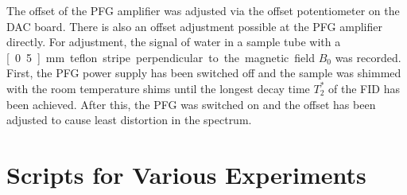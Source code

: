 \documentclass[12pt, a4paper, BCOR10mm, twoside, titlepage, headinclude]{scrbook}
\begin{document}
The offset of the PFG amplifier was adjusted via the offset potentiometer on the DAC board. There is also an offset adjustment possible at the PFG amplifier directly. For adjustment, the signal of water in a sample tube with a \unit[0.5]{mm} teflon stripe perpendicular to the magnetic field $B_{0}$ was recorded. First, the PFG power supply has been switched off and the sample was shimmed with the room temperature shims until the longest decay time $T^\ast_{2}$ of the FID has been  achieved. After this, the PFG was switched on and the offset has been adjusted to cause least distortion in the spectrum.

\chapter{Scripts for Various Experiments}

\newpage

%
%
%


\end{document}
